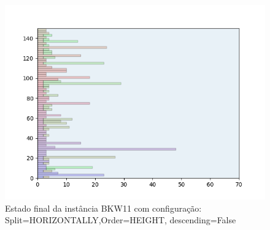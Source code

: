 \begin{figure}[H]
    \centering
    \caption[]{Estado final da instância BKW11 com configuração: Split=HORIZONTALLY,Order=HEIGHT, descending=False}
    \label{fig:bkw11-horizontally-height-false}
    \includegraphics[scale=0.5]{output/figures/bkw/bkw11/horizontally/height/false/000}
\end{figure}